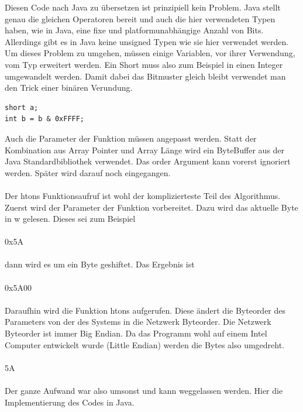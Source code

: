 Diesen Code nach Java zu übersetzen ist prinzipiell kein Problem. Java stellt
genau die gleichen Operatoren bereit und auch die hier verwendeten Typen haben, wie in Java,
eine fixe und platformunabhängige Anzahl von Bits. Allerdings gibt es in Java keine
unsigned Typen wie sie hier verwendet werden. Um dieses Problem zu umgehen, müssen
einige Variablen, vor ihrer Verwendung, vom Typ erweitert werden. Ein Short muss also
zum Beispiel in einen Integer umgewandelt werden. Damit dabei das Bitmuster gleich bleibt 
verwendet man den Trick einer binären Verundung.

\begin{lstlisting}
short a;
int b = b & 0xFFFF;
\end{lstlisting}

Auch die Parameter der Funktion müssen angepasst werden. Statt der Kombination aus Array Pointer und Array Länge
wird ein ByteBuffer aus der Java Standardbibliothek verwendet. Das order Argument
kann vorerst ignoriert werden. Später wird darauf noch eingegangen.
\\\\
Der htons Funktionsaufruf ist wohl der komplizierteste Teil des Algorithmus.
Zuerst wird der Parameter der Funktion vorbereitet. Dazu wird das aktuelle Byte in w gelesen.
Dieses sei zum Beispiel
\\
\\
0x5A
\\
\\
dann wird es um ein Byte geshiftet. Das Ergebnis ist
\\
\\
0x5A00
\\
\\
Daraufhin wird die Funktion htons aufgerufen. Diese ändert die Byteorder des Parameters 
von der des Systems in die Netzwerk Byteorder. Die Netzwerk Byteorder ist immer Big Endian.
Da das Programm wohl auf einem Intel Computer entwickelt wurde (Little Endian) werden
die Bytes also umgedreht. 
\\
\\
5A
\\
\\
Der ganze Aufwand war also umsonst und kann weggelassen werden. Hier die 
Implementierung des Codes in Java.

